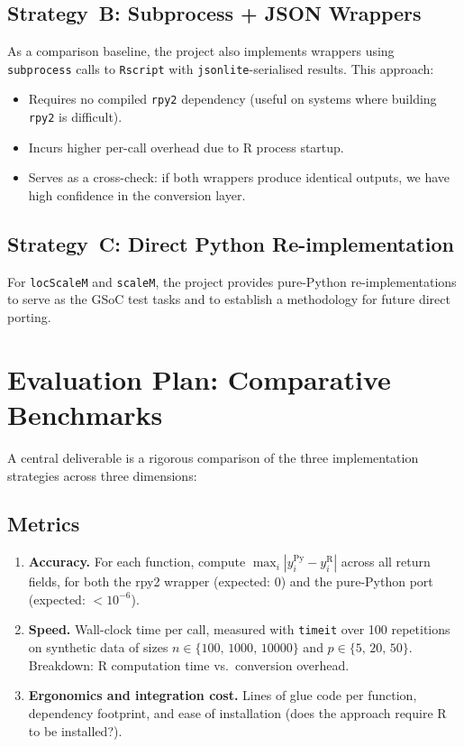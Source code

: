 \documentclass[11pt, a4paper]{article}
\begin{document}
\subsection{Strategy~B: Subprocess + JSON Wrappers}

As a comparison baseline, the project also implements wrappers using
\texttt{subprocess} calls to \texttt{Rscript} with
\texttt{jsonlite}-serialised results.
This approach:
\begin{itemize}[leftmargin=1.5em]
  \item Requires no compiled \texttt{rpy2} dependency (useful on systems
    where building \texttt{rpy2} is difficult).
  \item Incurs higher per-call overhead due to R process startup.
  \item Serves as a cross-check: if both wrappers produce identical
    outputs, we have high confidence in the conversion layer.
\end{itemize}



\subsection{Strategy~C: Direct Python Re-implementation}

For \texttt{locScaleM} and \texttt{scaleM}, the project provides
pure-Python re-implementations to serve as the GSoC test tasks and to
establish a methodology for future direct porting.

\section{Evaluation Plan: Comparative Benchmarks}

A central deliverable is a rigorous comparison of the three implementation
strategies across three dimensions:

\subsection{Metrics}

\begin{enumerate}[leftmargin=2em]
  \item \textbf{Accuracy.}
    For each function, compute $\max_i |y_i^{\text{Py}} - y_i^{\text{R}}|$
    across all return fields, for both the rpy2 wrapper (expected: $0$)
    and the pure-Python port (expected: $< 10^{-6}$).
  \item \textbf{Speed.}
    Wall-clock time per call, measured with \texttt{timeit} over 100
    repetitions on synthetic data of sizes $n \in \{100,\,1000,\,10000\}$
    and $p \in \{5,\,20,\,50\}$.
    Breakdown: R computation time vs.\ conversion overhead.
  \item \textbf{Ergonomics and integration cost.}
    Lines of glue code per function, dependency footprint, and ease of
    installation (does the approach require R to be installed?).
\end{enumerate}
\end{document}
